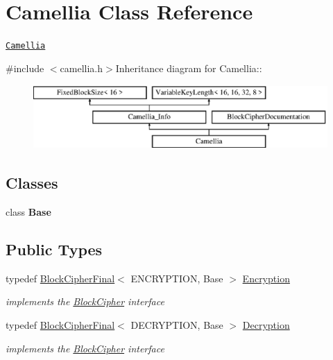 \hypertarget{class_camellia}{
\section{Camellia Class Reference}
\label{class_camellia}
}


\href{http://www.weidai.com/scan-mirror/cs.html#Camellia}{\tt Camellia}  


{\ttfamily \#include $<$camellia.h$>$}Inheritance diagram for Camellia::\begin{figure}[H]
\begin{center}
\leavevmode
\includegraphics[height=2.45614cm]{class_camellia}
\end{center}
\end{figure}
\subsection*{Classes}
\begin{DoxyCompactItemize}
\item 
class {\bfseries Base}
\end{DoxyCompactItemize}
\subsection*{Public Types}
\begin{DoxyCompactItemize}
\item 
\hypertarget{class_camellia_ac0e598a0e58bebed65cb8f69ecc54017}{
typedef \hyperlink{class_block_cipher_final}{BlockCipherFinal}$<$ ENCRYPTION, Base $>$ \hyperlink{class_camellia_ac0e598a0e58bebed65cb8f69ecc54017}{Encryption}}
\label{class_camellia_ac0e598a0e58bebed65cb8f69ecc54017}

\begin{DoxyCompactList}\small\item\em implements the \hyperlink{class_block_cipher}{BlockCipher} interface \item\end{DoxyCompactList}\item 
\hypertarget{class_camellia_adb0ec298c81ab263768564bb0e2c7262}{
typedef \hyperlink{class_block_cipher_final}{BlockCipherFinal}$<$ DECRYPTION, Base $>$ \hyperlink{class_camellia_adb0ec298c81ab263768564bb0e2c7262}{Decryption}}
\label{class_camellia_adb0ec298c81ab263768564bb0e2c7262}

\begin{DoxyCompactList}\small\item\em implements the \hyperlink{class_block_cipher}{BlockCipher} interface \item\end{DoxyCompactList}\end{DoxyCompactItemize}


